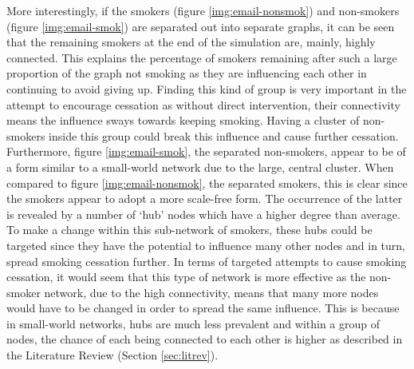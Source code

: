 \documentclass[]{report}
\begin{document}
More interestingly, if the smokers (figure \ref{img:email-nonsmok}) and non-smokers (figure \ref{img:email-smok}) are separated out into separate graphs, it can be seen that the remaining smokers at the end of the simulation are, mainly, highly connected. This explains the percentage of smokers remaining after such a large proportion of the graph not smoking as they are influencing each other in continuing to avoid giving up. Finding this kind of group is very important in the attempt to encourage cessation as without direct intervention, their connectivity means the influence sways towards keeping smoking. Having a cluster of non-smokers inside this group could break this influence and cause further cessation.
Furthermore, figure \ref{img:email-smok}, the separated non-smokers, appear to be of a form similar to a small-world network due to the large, central cluster. When compared to figure \ref{img:email-nonsmok}, the separated smokers, this is clear since the smokers appear to adopt a more scale-free form. The occurrence of the latter is revealed by a number of `hub' nodes which have a higher degree than average. To make a change within this sub-network of smokers, these hubs could be targeted since they have the potential to influence many other nodes and in turn, spread smoking cessation further. In terms of targeted attempts to cause smoking cessation, it would seem that this type of network is more effective as the non-smoker network, due to the high connectivity, means that many more nodes would have to be changed in order to spread the same influence. This is because in small-world networks, hubs are much less prevalent and within a group of nodes, the chance of each being connected to each other is higher as described in the Literature Review (Section \ref{sec:litrev}).
\end{document}
